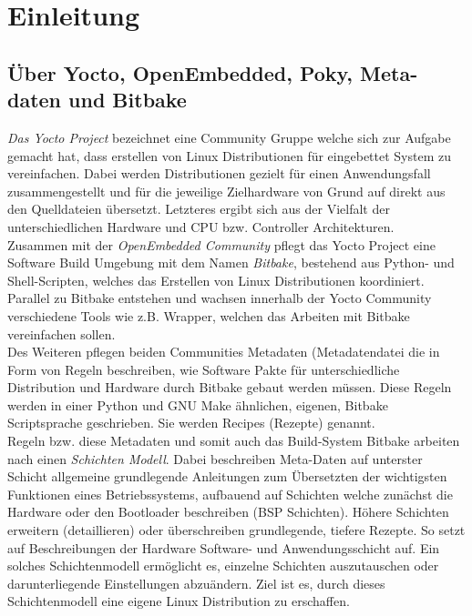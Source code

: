 \chapter{Einleitung} \label{chp:einleitung}


\section{Über Yocto, OpenEmbedded, Poky, Meta-daten und Bitbake}

\textit{Das \gls{Yocto} Project} bezeichnet eine Community Gruppe welche
sich zur Aufgabe gemacht hat, dass erstellen von Linux Distributionen für
eingebettet System zu vereinfachen. Dabei werden Distributionen gezielt für
einen Anwendungsfall zusammengestellt und für die jeweilige Zielhardware von
Grund auf direkt aus den Quelldateien übersetzt. Letzteres ergibt sich aus der
Vielfalt der unterschiedlichen Hardware und CPU bzw. Controller Architekturen.\\

Zusammen mit der \textit{\gls{OpenEmbedded} Community} pflegt das Yocto Project
eine Software Build Umgebung mit dem Namen \textit{\gls{Bitbake}}, bestehend aus
Python- und Shell-Scripten, welches das Erstellen von Linux Distributionen
koordiniert. Parallel zu Bitbake entstehen und wachsen innerhalb der Yocto
Community verschiedene \glspl{Tool} wie z.B. \gls{Wrapper}, welchen das Arbeiten
mit Bitbake vereinfachen sollen. \\

Des Weiteren pflegen beiden Communities \gls{Metadaten} (\gls{Metadatendatei}
die in Form von Regeln beschreiben, wie Software Pakte für unterschiedliche
Distribution und Hardware durch Bitbake gebaut werden müssen. Diese Regeln
werden in einer Python und GNU Make ähnlichen, eigenen, Bitbake Scriptsprache
geschrieben. Sie werden \gls{Recipes} (Rezepte) genannt.  \\

Regeln bzw. diese Metadaten und somit auch das Build-System Bitbake arbeiten
nach einen \textit{Schichten Modell}. Dabei beschreiben Meta-Daten auf unterster
Schicht allgemeine grundlegende Anleitungen zum Übersetzten der wichtigsten
Funktionen eines Betriebssystems, aufbauend auf Schichten welche zunächst die
Hardware oder den Bootloader beschreiben (\acf{BSP} Schichten). Höhere Schichten
erweitern (detaillieren) oder überschreiben grundlegende, tiefere Rezepte.  So
setzt auf Beschreibungen der Hardware Software- und Anwendungsschicht auf. Ein
solches Schichtenmodell ermöglicht es, einzelne Schichten auszutauschen oder
darunterliegende Einstellungen abzuändern. Ziel ist es, durch dieses
Schichtenmodell eine eigene Linux Distribution zu erschaffen.  \\

